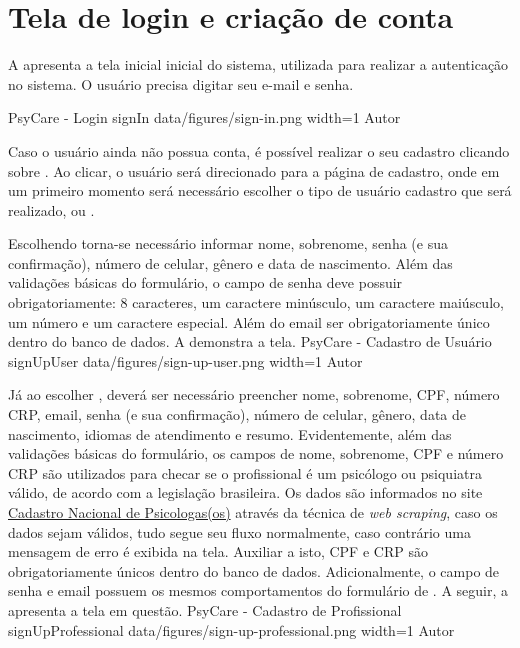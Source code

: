 \section{Tela de login e criação de conta}
\label{sec:loginCriacao}

A  apresenta a tela inicial inicial do sistema, utilizada para realizar a autenticação no sistema. O usuário precisa digitar seu e-mail e senha.

\image
    {PsyCare - Login}
    {signIn}
    {data/figures/sign-in.png}
    {width=1\textwidth}
    {Autor}

Caso o usuário ainda não possua conta, é possível realizar o seu cadastro clicando sobre . Ao clicar, o usuário será direcionado para a página de cadastro, onde em um primeiro momento será necessário escolher o tipo de usuário cadastro que será realizado,  ou . 

Escolhendo  torna-se necessário informar nome, sobrenome, senha (e sua confirmação), número de celular, gênero e data de nascimento. Além das validações básicas do formulário, o campo de senha deve possuir obrigatoriamente: 8 caracteres, um caractere minúsculo, um caractere maiúsculo, um número e um caractere especial. Além do email ser obrigatoriamente único dentro do banco de dados. A  demonstra a tela.
\image
    {PsyCare - Cadastro de Usuário}
    {signUpUser}
    {data/figures/sign-up-user.png}
    {width=1\textwidth}
    {Autor}

Já ao escolher , deverá ser necessário preencher nome, sobrenome, CPF, número CRP, email, senha (e sua confirmação), número de celular, gênero, data de nascimento, idiomas de atendimento e resumo. Evidentemente, além das validações básicas do formulário, os campos de nome, sobrenome, CPF e número CRP são utilizados para checar se o profissional é um psicólogo ou psiquiatra válido, de acordo com a legislação brasileira. Os dados são informados no site \href{https://cadastro.cfp.org.br/}{Cadastro Nacional de Psicologas(os)} através da técnica de \textit{web scraping}, caso os dados sejam válidos, tudo segue seu fluxo normalmente, caso contrário uma mensagem de erro é exibida na tela. Auxiliar a isto, CPF e CRP são obrigatoriamente únicos dentro do banco de dados. Adicionalmente, o campo de senha e email possuem os mesmos comportamentos do formulário de . A seguir, a  apresenta a tela em questão.
\image
    {PsyCare - Cadastro de Profissional}
    {signUpProfessional}
    {data/figures/sign-up-professional.png}
    {width=1\textwidth}
    {Autor}